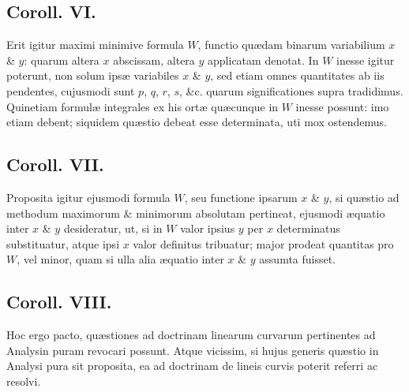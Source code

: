 \subsection*{Coroll. VI.}
Erit igitur maximi minimive formula $W$, functio quædam binarum variabilium $x$ \& $y$: quarum altera $x$ abscissam, altera $y$ applicatam denotat. In $W$ inesse igitur poterunt, non solum ipsæ variabiles $x$ \& $y$, sed etiam omnes quantitates ab iis pendentes, cujusmodi sunt $p$, $q$, $r$, $s$, \&c. quarum significationes supra tradidimus. Quinetiam formulæ integrales ex his ortæ quæcunque in $W$ inesse possunt: imo etiam debent; siquidem quæstio debeat esse determinata, uti mox ostendemus.

\subsection*{Coroll. VII.}
Proposita igitur ejusmodi formula $W$, seu functione ipsarum $x$ \& $y$, si quæstio ad methodum maximorum \& minimorum absolutam pertineat, ejusmodi æquatio inter $x$ \& $y$ desideratur, ut, si in $W$ valor ipsius $y$ per $x$ determinatus substituatur, atque ipsi $x$ valor definitus tribuatur; major prodeat quantitas pro $W$, vel minor, quam si ulla alia æquatio inter $x$ \& $y$ assumta fuisset.

\subsection*{Coroll. VIII.}
Hoc ergo pacto, quæstiones ad doctrinam linearum curvarum pertinentes ad Analysin puram revocari possunt. Atque vicissim, si hujus generis quæstio in Analysi pura sit proposita, ea ad doctrinam de lineis curvis poterit referri ac resolvi.

